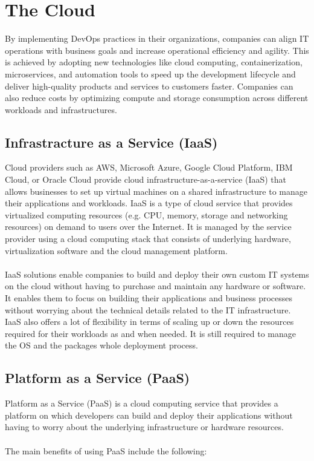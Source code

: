 \documentclass[MMR,Master,nenglish]{twbook}%
\begin{document}
\section{The Cloud}
By implementing DevOps practices in their organizations, companies can align IT operations with business goals and increase operational efficiency and agility. This is achieved by adopting new technologies like cloud computing, containerization, microservices, and automation tools to speed up the development lifecycle and deliver high-quality products and services to customers faster. Companies can also reduce costs by optimizing compute and storage consumption across different workloads and infrastructures.\cite{qia2009}

\subsection{Infrastracture as a Service (IaaS)}
Cloud providers such as AWS, Microsoft Azure, Google Cloud Platform, IBM Cloud, or Oracle Cloud provide cloud infrastructure-as-a-service (IaaS) that allows businesses to set up virtual machines on a shared infrastructure to manage their applications and workloads. IaaS is a type of cloud service that provides virtualized computing resources (e.g. CPU, memory, storage and networking resources) on demand to users over the Internet. It is managed by the service provider using a cloud computing stack that consists of underlying hardware, virtualization software and the cloud management platform.\cite{buy2019} 
\\
\\
IaaS solutions enable companies to build and deploy their own custom IT systems on the cloud without having to purchase and maintain any hardware or software. It enables them to focus on building their applications and business processes without worrying about the technical details related to the IT infrastructure. IaaS also offers a lot of flexibility in terms of scaling up or down the resources required for their workloads as and when needed. It is still required to manage the OS and the packages whole deployment process.

\subsection{Platform as a Service (PaaS)}
Platform as a Service (PaaS) is a cloud computing service that provides a platform on which developers can build and deploy their applications without having to worry about the underlying infrastructure or hardware resources. 
\\
\\
The main benefits of using PaaS include the following: 
\end{document}
